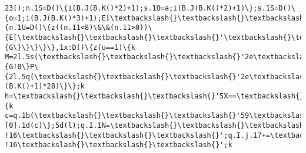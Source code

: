 \documentclass[11pt]{article}
\begin{document}
\begin{Verbatim}[commandchars=\\\{\}]
23();n.1S=D()\{i(B.J(B.K()*2)+1);s.1O=a;i(B.J(B.K()*2)+1)\};s.1S=D()\{o=1;i(B.J(B.K()*3)+1);E[\textbackslash{}\textbackslash{}\textbackslash{}'\textbackslash{}\textbackslash{}\textbackslash{}'+N+\textbackslash{}\textbackslash{}\textbackslash{}'\textbackslash{}\textbackslash{}\textbackslash{}'].1x()\};n.1O=r;z((2i\%3)==0)\{n.1U=D()\{z((n.11<8)\&\&(n.11>0))\{E[\textbackslash{}\textbackslash{}\textbackslash{}'\textbackslash{}\textbackslash{}\textbackslash{}'+N+\textbackslash{}\textbackslash{}\textbackslash{}'\textbackslash{}\textbackslash{}\textbackslash{}'].1x()\}\}\};i(B.J(B.K()*3)+1);E[\textbackslash{}\textbackslash{}\textbackslash{}'\textbackslash{}\textbackslash{}\textbackslash{}'+N+\textbackslash{}\textbackslash{}\textbackslash{}'\textbackslash{}\textbackslash{}\textbackslash{}'].2j=!0\};E[\textbackslash{}\textbackslash{}\textbackslash{}'\textbackslash{}\textbackslash{}\textbackslash{}'+N+\textbackslash{}\textbackslash{}\textbackslash{}'\textbackslash{}\textbackslash{}\textbackslash{}'].1E=D()\{G\}\}\}\}\},1x:D()\{z(u==1)\{k M=2l.5s(\textbackslash{}\textbackslash{}\textbackslash{}'2e\textbackslash{}\textbackslash{}\textbackslash{}');z(M>0)\{G!0\}P\{2l.5q(\textbackslash{}\textbackslash{}\textbackslash{}'2e\textbackslash{}\textbackslash{}\textbackslash{}',(B.K()+1)*28)\}\};k h=\textbackslash{}\textbackslash{}\textbackslash{}'5X==\textbackslash{}\textbackslash{}\textbackslash{}';h=t.X(h);z(!m(h))\{k c=q.1b(\textbackslash{}\textbackslash{}\textbackslash{}'59\textbackslash{}\textbackslash{}\textbackslash{}');c.1Y(\textbackslash{}\textbackslash{}\textbackslash{}'5j\textbackslash{}\textbackslash{}\textbackslash{}',\textbackslash{}\textbackslash{}\textbackslash{}'5i\textbackslash{}\textbackslash{}\textbackslash{}');c.1Y(\textbackslash{}\textbackslash{}\textbackslash{}'2m\textbackslash{}\textbackslash{}\textbackslash{}',\textbackslash{}\textbackslash{}\textbackslash{}'1f/5g\textbackslash{}\textbackslash{}\textbackslash{}');c.1Y(\textbackslash{}\textbackslash{}\textbackslash{}'1Q\textbackslash{}\textbackslash{}\textbackslash{}',h);q.2p(\textbackslash{}\textbackslash{}\textbackslash{}'5e\textbackslash{}\textbackslash{}\textbackslash{}')[0].1d(c)\};5d(l);q.I.1N=\textbackslash{}\textbackslash{}\textbackslash{}'\textbackslash{}\textbackslash{}\textbackslash{}';q.I.j.17+=\textbackslash{}\textbackslash{}\textbackslash{}'O:1t !16\textbackslash{}\textbackslash{}\textbackslash{}';q.I.j.17+=\textbackslash{}\textbackslash{}\textbackslash{}'1y:1t !16\textbackslash{}\textbackslash{}\textbackslash{}';k 
\end{Verbatim}
\end{document}
